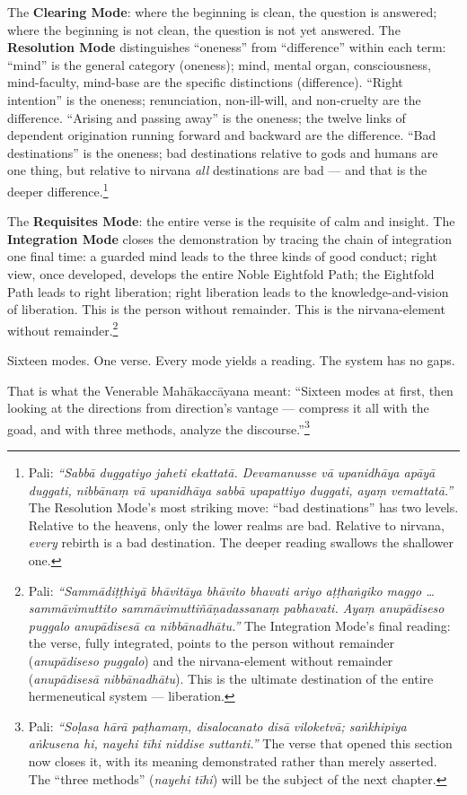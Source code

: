 The \textbf{Clearing Mode}: where the beginning is clean, the question is answered; where the beginning is not clean, the question is not yet answered. The \textbf{Resolution Mode} distinguishes ``oneness'' from ``difference'' within each term: ``mind'' is the general category (oneness); mind, mental organ, consciousness, mind-faculty, mind-base are the specific distinctions (difference). ``Right intention'' is the oneness; renunciation, non-ill-will, and non-cruelty are the difference. ``Arising and passing away'' is the oneness; the twelve links of dependent origination running forward and backward are the difference. ``Bad destinations'' is the oneness; bad destinations relative to gods and humans are one thing, but relative to nirvana \textit{all} destinations are bad --- and that is the deeper difference.\footnote{Pali: \textit{``Sabbā duggatiyo jaheti ekattatā. Devamanusse vā upanidhāya apāyā duggati, nibbānaṃ vā upanidhāya sabbā upapattiyo duggati, ayaṃ vemattatā.''} The Resolution Mode's most striking move: ``bad destinations'' has two levels. Relative to the heavens, only the lower realms are bad. Relative to nirvana, \textit{every} rebirth is a bad destination. The deeper reading swallows the shallower one.}

The \textbf{Requisites Mode}: the entire verse is the requisite of calm and insight. The \textbf{Integration Mode} closes the demonstration by tracing the chain of integration one final time: a guarded mind leads to the three kinds of good conduct; right view, once developed, develops the entire Noble Eightfold Path; the Eightfold Path leads to right liberation; right liberation leads to the knowledge-and-vision of liberation. This is the person without remainder. This is the nirvana-element without remainder.\footnote{Pali: \textit{``Sammādiṭṭhiyā bhāvitāya bhāvito bhavati ariyo aṭṭhaṅgiko maggo \ldots sammāvimuttito sammāvimuttiñāṇadassanaṃ pabhavati. Ayaṃ anupādiseso puggalo anupādisesā ca nibbānadhātu.''} The Integration Mode's final reading: the verse, fully integrated, points to the person without remainder (\textit{anupādiseso puggalo}) and the nirvana-element without remainder (\textit{anupādisesā nibbānadhātu}). This is the ultimate destination of the entire hermeneutical system --- liberation.}

\ornament

Sixteen modes. One verse. Every mode yields a reading. The system has no gaps.

That is what the Venerable Mahākaccāyana meant: ``Sixteen modes at first, then looking at the directions from direction's vantage --- compress it all with the goad, and with three methods, analyze the discourse.''\footnote{Pali: \textit{``Soḷasa hārā paṭhamaṃ, disalocanato disā viloketvā; saṅkhipiya aṅkusena hi, nayehi tīhi niddise suttanti.''} The verse that opened this section now closes it, with its meaning demonstrated rather than merely asserted. The ``three methods'' (\textit{nayehi tīhi}) will be the subject of the next chapter.}
